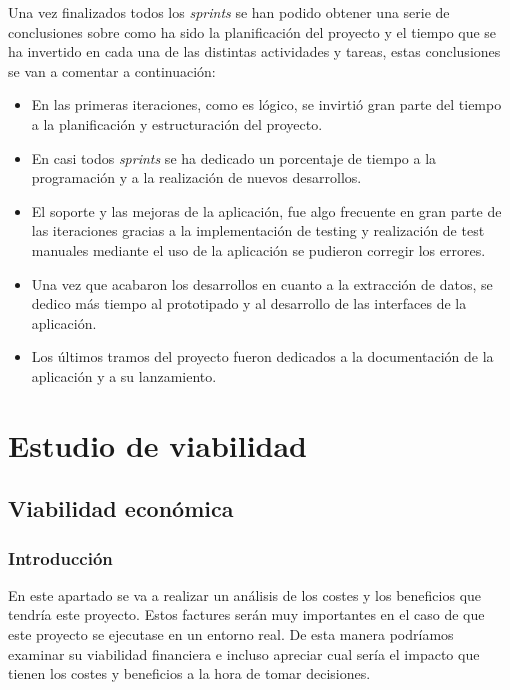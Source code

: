 Una vez finalizados todos los \textit{sprints} se han podido obtener una serie de conclusiones sobre como ha sido la planificación del proyecto y el tiempo que se ha invertido en cada una de las distintas actividades y tareas, estas conclusiones se van a comentar a continuación:

\begin{itemize}
\item En las primeras iteraciones, como es lógico, se invirtió gran parte del tiempo a la planificación y estructuración del proyecto.

\item En casi todos \textit{sprints} se ha dedicado un porcentaje de tiempo a la programación y a la realización de nuevos desarrollos.

\item El soporte y las mejoras de la aplicación, fue algo frecuente en gran parte de las iteraciones gracias a la implementación de testing y realización de test manuales mediante el uso de la aplicación se pudieron corregir los errores.

\item Una vez que acabaron los desarrollos en cuanto a la extracción de datos, se dedico más tiempo al prototipado y al desarrollo de las interfaces de la aplicación.

\item Los últimos tramos del proyecto fueron dedicados a la documentación de la aplicación y a su lanzamiento.

\end{itemize}

\section{Estudio de viabilidad}

\subsection{Viabilidad económica}

\subsubsection{Introducción}
En este apartado se va a realizar un análisis de los costes y los beneficios que tendría este proyecto. Estos factures serán muy importantes en el caso de que este proyecto se ejecutase en un entorno real. De esta manera podríamos examinar su viabilidad financiera e incluso apreciar cual sería el impacto que tienen los costes y beneficios a la hora de tomar decisiones.

